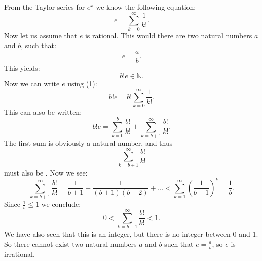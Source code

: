\documentclass[12pt]{article}
\begin{document}
From the Taylor series for $e^x$ we know the following equation:
\begin{equation}
e=\sum_{k=0}^{\infty}\frac{1}{k!}.
\end{equation}
Now let us assume that $e$ is rational. This would  there are two natural numbers $a$ and $b$, such that:
$$e=\frac{a}{b}.$$
This yields:
$$b!e\in\mathbb{N}.$$
Now we can write $e$ using (1):
$$b!e=b!\sum_{k=0}^{\infty}\frac{1}{k!}.$$
This can also be written:
$$b!e=\sum_{k=0}^{b}\frac{b!}{k!}+\sum_{k=b+1}^{\infty}\frac{b!}{k!}.$$
The first sum is obviously a natural number, and thus
$$\sum_{k=b+1}^{\infty}\frac{b!}{k!}$$
must also be . Now we see:
$$\sum_{k=b+1}^{\infty}\frac{b!}{k!}=\frac{1}{b+1}+\frac{1}{(b+1)(b+2)}+...<
\sum_{k=1}^{\infty}\left(\frac{1}{b+1}\right)^k=\frac{1}{b}.$$
Since $\frac{1}{b}\leq 1$ we conclude:
$$0<\sum_{k=b+1}^{\infty}\frac{b!}{k!}<1.$$
We have also seen that this is an integer, but there is no integer between 0 and 1. So there cannot exist two natural numbers $a$ and $b$ such that $e=\frac{a}{b}$, so $e$ is irrational.
\end{document}
